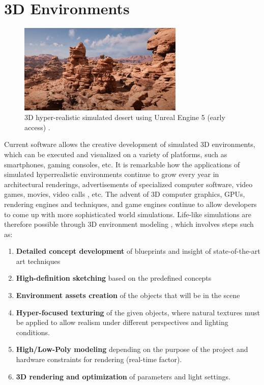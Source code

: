 
\section{3D Environments}\label{chap2:3denvironment}

\begin{figure}[!ht]
    \centering
    \includegraphics[width=0.7\textwidth]{images/unreal-desert2.png}
    \caption{3D hyper-realistic simulated desert using Unreal Engine 5 (early access) \cite{unreal5_2021}.}
    \label{fig:unreal-desert}
\end{figure}
    
    
Current software allows the creative development of simulated 3D environments, which can be executed and visualized on a variety of platforms, such as smartphones, gaming consoles, etc. 
It is remarkable how the applications of simulated hyperrealistic environments continue to grow every year in architectural renderings, advertisements of specialized computer software, video games, movies, video calls \cite{spatial-io2021}, etc.
The advent of 3D computer graphics, GPUs, rendering engines and techniques, and game engines continue to allow developers to come up with more sophisticated world simulations.
Life-like simulations are therefore possible through 3D environment modeling \cite{asma_2021}, which involves steps such as:
\begin{enumerate}
    \item \textbf{Detailed concept development} of blueprints and insight of state-of-the-art art techniques
    \item \textbf{High-definition sketching} based on the predefined concepts 
    \item \textbf{Environment assets creation} of the objects that will be in the scene
    \item \textbf{Hyper-focused texturing} of the given objects, where natural textures must be applied to allow realism under different perspectives and lighting conditions.
    \item \textbf{High/Low-Poly modeling} depending on the purpose of the project and hardware constraints for rendering (real-time factor).
    \item \textbf{3D rendering and optimization} of parameters and light settings.
\end{enumerate}

